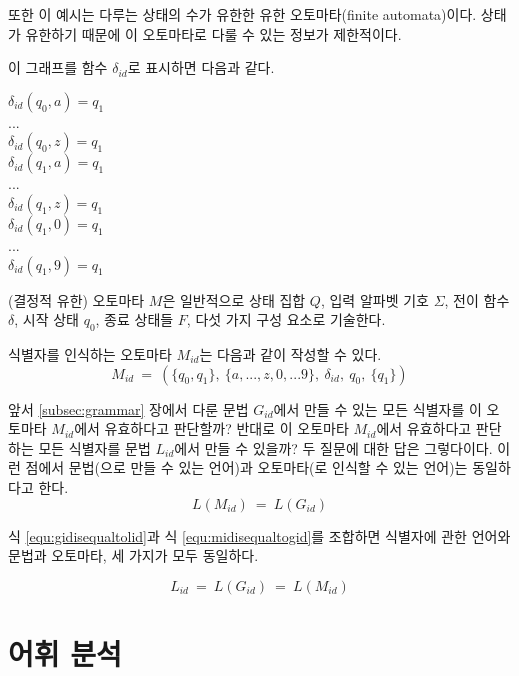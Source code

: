 \documentclass[a4paper]{book}
\begin{document}
또한 이 예시는 다루는 상태의 수가 유한한 유한 오토마타(finite
automata)이다. 상태가 유한하기 때문에 이 오토마타로 다룰 수 있는
정보가 제한적이다.


이 그래프를 함수 $\delta_{id}$로 표시하면 다음과 같다.

\begin{center}
  $\delta_{id}(q_0, a) = q_1$ \\
  ... \\
  $\delta_{id}(q_0, z) = q_1$ \\
  $\delta_{id}(q_1, a) = q_1$ \\
  ... \\
  $\delta_{id}(q_1, z) = q_1$ \\
  $\delta_{id}(q_1, 0) = q_1$ \\
  ... \\
  $\delta_{id}(q_1, 9) = q_1$ \\
\end{center}

(결정적 유한) 오토마타 $M$은 일반적으로 상태 집합 $Q$, 입력 알파벳
기호 $\Sigma$, 전이 함수 $\delta$, 시작 상태 $q_0$, 종료 상태들 $F$,
다섯 가지 구성 요소로 기술한다.


식별자를 인식하는 오토마타 $M_{id}$는 다음과 같이 작성할 수 있다.
\[
M_{id} \ = \ (\{q_0,q_1\}, \ \{a,...,z,0,...9\}, \ \delta_{id}, \ q_0, \ \{q_1\} )
\]

앞서 \ref{subsec:grammar} 장에서 다룬 문법 $G_{id}$에서 만들 수 있는
모든 식별자를 이 오토마타 $M_{id}$에서 유효하다고 판단할까? 반대로 이
오토마타 $M_{id}$에서 유효하다고 판단하는 모든 식별자를 문법
$L_{id}$에서 만들 수 있을까? 두 질문에 대한 답은 그렇다이다.
%
이런 점에서 문법(으로 만들 수 있는 언어)과 오토마타(로 인식할 수 있는
언어)는 동일하다고 한다.
\begin{equation}
  L(M_{id}) \ = \ L(G_{id})
  \label{equ:midisequaltogid}
\end{equation}

식 \ref{equ:gidisequaltolid}과 식 \ref{equ:midisequaltogid}를 조합하면
식별자에 관한 언어와 문법과 오토마타, 세 가지가 모두 동일하다.


\begin{equation}
  L_{id} \ = \ L(G_{id}) \ = \ L(M_{id})
  \label{equ:lisisequaltomidisequaltogid}
\end{equation}

\section{어휘 분석}
\end{document}
